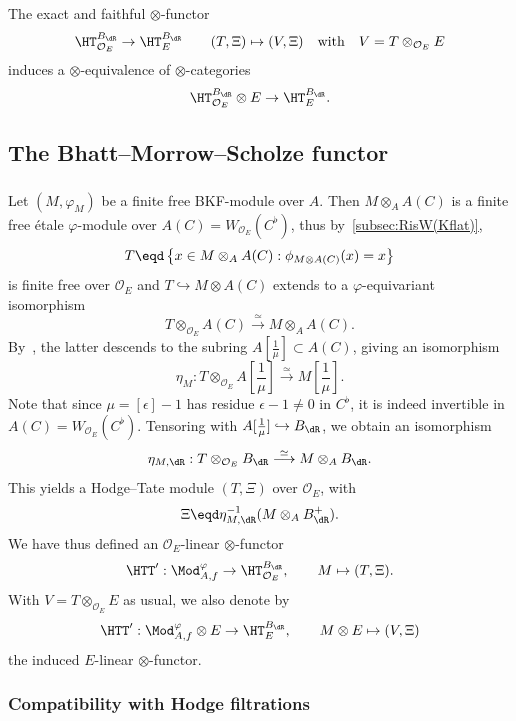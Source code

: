 The exact and faithful $\otimes$-functor
\[
\HT_{\mathcal{O}_{E}}^{B_{\dR}}\rightarrow\HT_{E}^{B_{\dR}}\qquad(T,\Xi)\mapsto(V,\Xi)\quad\text{with}\quad V=T\otimes_{\mathcal{O}_{E}}E
\]
induces a $\otimes$-equivalence of $\otimes$-categories
\[
\HT_{\mathcal{O}_{E}}^{B_{\dR}}\otimes E\rightarrow\HT_{E}^{B_{\dR}}.
\]


\subsection{The Bhatt--Morrow--Scholze functor}\label{subsec:The-Bhatt--Morrow--Scholze-functor}

\subsubsection{}

Let $(M,\varphi_{M})$ be a finite free BKF-module over $A$. Then $M\otimes_{A}A(C)$ is a finite free \'etale $\varphi$-module over $A(C)=W_{\mathcal{O}_{E}}(C^{\flat})$, thus by~\ref{subsec:RisW(Kflat)},
\[
T\eqd\left\{ x\in M\otimes_{A}A(C):\phi_{M\otimes A(C)}(x)=x\right\}
\]
is finite free over $\mathcal{O}_{E}$ and $T\hookrightarrow M\otimes A(C)$ extends to a $\varphi$-equivariant isomorphism
\[
T\otimes_{\mathcal{O}_{E}}A(C)\stackrel{\simeq}{\longrightarrow}M\otimes_{A}A(C).
\]
By~\cite[4.26]{BaMoSc16}, the latter descends to the subring $A[\frac{1}{\mu}]\subset A(C)$, giving an isomorphism
\[
\eta_{M}:T\otimes_{\mathcal{O}_{E}}A\!\left[\frac{1}{\mu}\right]\stackrel{\simeq}{\longrightarrow}M\!\left[\frac{1}{\mu}\right].
\]
Note that since $\mu=[\epsilon]-1$ has residue $\epsilon-1\neq0$ in $C^{\flat}$, it is indeed invertible in $A(C)=W_{\mathcal{O}_{E}}(C^{\flat})$. Tensoring with $A[\frac{1}{\mu}]\hookrightarrow B_{\dR}$, we obtain an isomorphism
\[
\eta_{M,\dR}:T\otimes_{\mathcal{O}_{E}}B_{\dR}\stackrel{\simeq}{\longrightarrow}M\otimes_{A}B_{\dR}.
\]
This yields a Hodge--Tate module $(T,\Xi)$ over $\mathcal{O}_{E}$, with
\[
\Xi\eqd\eta_{M,\dR}^{-1}(M\otimes_{A}B_{\dR}^{+}).
\]
We have thus defined an $\mathcal{O}_{E}$-linear $\otimes$-functor
\[
\HTT^{\prime}:\Mod_{A,f}^{\varphi}\rightarrow\HT_{\mathcal{O}_{E}}^{B_{\dR}},\qquad M\mapsto(T,\Xi).
\]
With $V=T\otimes_{\mathcal{O}_{E}}E$ as usual, we also denote by
\[
\HTT^{\prime}:\Mod_{A,f}^{\varphi}\otimes E\rightarrow\HT_{E}^{B_{\dR}},\qquad M\otimes E\mapsto(V,\Xi)
\]
the induced $E$-linear $\otimes$-functor.

\subsubsection{Compatibility with Hodge filtrations}

